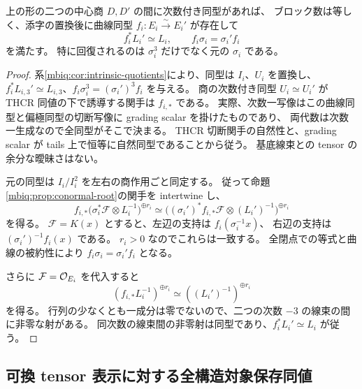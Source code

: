 \begin{theorem}
\label{mbiq:thm:triple-recovery}
上の形の二つの中心商 $D,D'$ の間に次数付き同型があれば、
ブロック数は等しく、添字の置換後に曲線同型 $f_i:E_i\xrightarrow{\sim}E_i'$ が存在して
\begin{equation}\label{mbiq:eq:recovered-triple}
 f_i^*L_i'\simeq L_i,\qquad
 f_i\sigma_i=\sigma_i'f_i
\end{equation}
を満たす。
特に回復されるのは $\sigma_i^3$ だけでなく元の $\sigma_i$ である。
\end{theorem}
\begin{proof}
系\ref{mbiq:cor:intrinsic-quotients}により、同型は $I_i$、$U_i$ を置換し、
$f_i^*L_{i,3}'\simeq L_{i,3}$、$f_i\sigma_i^3=(\sigma_i')^3f_i$ を与える。
商の次数付き同型 $U_i\simeq U_i'$ が THCR 同値の下で誘導する関手は $f_{i,*}$ である。
実際、次数一写像はこの曲線同型と偏極同型の切断写像に grading scalar を掛けたものであり、
両代数は次数一生成なので全同型がそこで決まる。
THCR 切断関手の自然性と、grading scalar が tails 上で恒等に自然同型であることから従う。
基底線束との tensor の余分な曖昧さはない。

元の同型は $I_i/I_i^2$ を左右の商作用ごと同定する。
従って命題\ref{mbiq:prop:conormal-root}の関手を intertwine し、
\[
 f_{i,*}\bigl(\sigma_i^*\mathcal F\otimes L_i^{-1}\bigr)^{\oplus r_i}
 \simeq
 \bigl((\sigma_i')^*f_{i,*}\mathcal F\otimes(L_i')^{-1}\bigr)^{\oplus r_i}
\]
を得る。
$\mathcal F=K(x)$ とすると、左辺の支持は $f_i(\sigma_i^{-1}x)$、
右辺の支持は $(\sigma_i')^{-1}f_i(x)$ である。
$r_i>0$ なのでこれらは一致する。
全閉点での等式と曲線の被約性により $f_i\sigma_i=\sigma_i'f_i$ となる。

さらに $\mathcal F=\mathcal O_{E_i}$ を代入すると
\[
 (f_{i,*}L_i^{-1})^{\oplus r_i}
       \simeq((L_i')^{-1})^{\oplus r_i}
\]
を得る。
行列の少なくとも一成分は零でないので、二つの次数 $-3$ の線束の間に非零な射がある。
同次数の線束間の非零射は同型であり、$f_i^*L_i'\simeq L_i$ が従う。
\end{proof}

\subsection{可換 tensor 表示に対する全構造対象保存同値}

